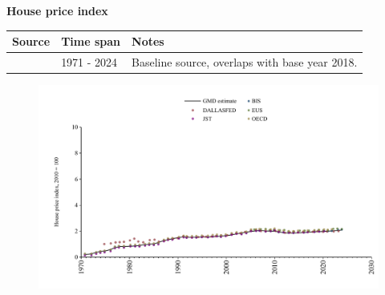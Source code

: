 \documentclass[12pt,a4paper,landscape]{article}
\begin{document}
\begin{adjustbox}{max totalsize={\paperwidth}{\paperheight},center}
\begin{minipage}[t][\textheight][t]{\textwidth}
\vspace*{0.5cm}
{}
\begin{center}
{\Large\bfseries House price index}
\end{center}
\vspace{0.5cm}
\begin{table}[H]
\centering
\small
\begin{tabular}{|l|l|l|}
\hline
\textbf{Source} & \textbf{Time span} & \textbf{Notes} \\
\hline
\rowcolor{white}\cite{BIS}& 1971 - 2024 &Baseline source, overlaps with base year 2018. \\
\hline
\end{tabular}
\end{table}
\begin{figure}[H]
\centering
\includegraphics[width=\textwidth,height=0.6\textheight,keepaspectratio]{graphs/ESP_HPI.pdf}
\end{figure}
\end{minipage}
\end{adjustbox}
\end{document}
